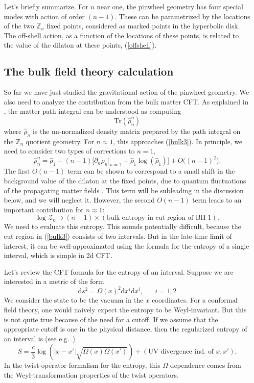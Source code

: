 \documentclass[11pt]{article}
\newcommand{\be}{\begin{equation}}
\newcommand{\ee}{\end{equation}}
\numberwithin{equation}{section}
\def\tr{\text{Tr}}
\begin{document}
Let's briefly summarize. For $n$ near one, the pinwheel geometry has four special modes with action of order $(n-1)$. These can be parametrized by the locations of the two $\mathbb{Z}_n$ fixed points, considered as marked points in the hyperbolic disk. The off-shell action, as a function of the locations of these points, is related to the value of the dilaton at these points, (\ref{offshell}).

\subsection{The bulk field theory calculation}
So far we have just studied the gravitational action of the pinwheel geometry. We also need to analyze the contribution from the bulk matter CFT. As explained in \cite{Faulkner:2013ana}, the matter path integral can be understood as computing 
\be
\tr(\widehat{\rho}_n^n)
\ee
where $\widehat{\rho}_n$ is the un-normalized density matrix prepared by the path integral on the $\mathbb{Z}_n$ quotient geometry. For $n\approx 1$, this approaches (\ref{bulk3}). In principle, we need to consider two types of corrections to $n = 1$, 
\be
\widehat{\rho}_n^n = \widehat{\rho}_1 + (n-1)\big[\partial_n \widehat{\rho}_n|_{n = 1}+\widehat{\rho}_1\log(\widehat{\rho}_1)\big] + O\big((n-1)^2\big).
\ee
The first $O(n-1)$ term can be shown to correspond to a small shift in the background value of the dilaton at the fixed points, due to quantum fluctuations of the propagating matter fields \cite{Faulkner:2013ana,Dong:2017xht}. This term will be subleading in the discussion below, and we will neglect it. However, the second $O(n-1)$ term leads to an important contribution for $n\approx 1$:
\be
\log\mathcal{Z}_n \supset (n-1)\times (\text{bulk entropy in cut region of BH 1}).
\ee
We need to evaluate this entropy. This sounds potentially difficult, because the cut region in (\ref{bulk3}) consists of two intervals. But in the late-time limit of interest, it can be well-approximated \cite{Almheiri:2019yqk} using the formula for the entropy of a single interval, which is simple in 2d CFT.

Let's review the CFT formula for the entropy of an interval. Suppose we are interested in a metric of the form
\be
\mathrm{d}s^2 = \Omega(x)^2\mathrm{d}x^i \mathrm{d}x^i, \hspace{20pt} i = 1,2
\ee
We consider the state to be the vacuum in the $x$ coordinates. For a conformal field theory, one would naively expect the entropy to be Weyl-invariant. But this is not quite true because of the need for a cutoff. If we assume that the appropriate cutoff is one in the physical distance, then the regularized entropy of an interval is (see e.g.~\cite{Calabrese:2009qy})
\be
S = \frac{c}{3}\log\left(|x - x'|\sqrt{\Omega(x)\Omega(x')}\right) + (\text{UV divergence ind. of $x,x'$}).\label{entform}
\ee
In the twist-operator formalism for the entropy, this $\Omega$ dependence comes from the Weyl-transformation properties of the twist operators.
\end{document}
